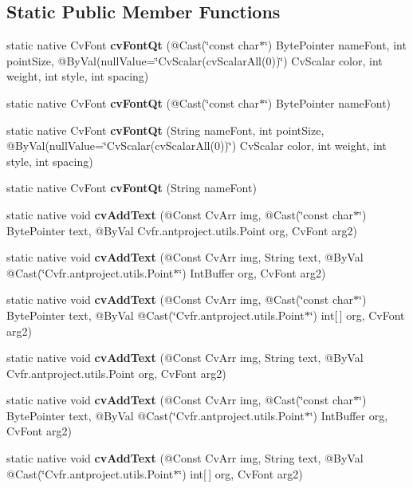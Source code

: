 \subsection*{Static Public Member Functions}
\begin{DoxyCompactItemize}
\item 
static native Cv\+Font {\bfseries cv\+Font\+Qt} (@Cast(\char`\"{}const char$\ast$\char`\"{}) Byte\+Pointer name\+Font, int point\+Size, @By\+Val(null\+Value=\char`\"{}Cv\+Scalar(cv\+Scalar\+All(0))\char`\"{}) Cv\+Scalar color, int weight, int style, int spacing)
\item 
static native Cv\+Font {\bfseries cv\+Font\+Qt} (@Cast(\char`\"{}const char$\ast$\char`\"{}) Byte\+Pointer name\+Font)
\item 
static native Cv\+Font {\bfseries cv\+Font\+Qt} (String name\+Font, int point\+Size, @By\+Val(null\+Value=\char`\"{}Cv\+Scalar(cv\+Scalar\+All(0))\char`\"{}) Cv\+Scalar color, int weight, int style, int spacing)
\item 
static native Cv\+Font {\bfseries cv\+Font\+Qt} (String name\+Font)
\item 
static native void {\bfseries cv\+Add\+Text} (@Const Cv\+Arr img, @Cast(\char`\"{}const char$\ast$\char`\"{}) Byte\+Pointer text, @By\+Val Cv\+fr.antproject.utils.Point org, Cv\+Font arg2)
\item 
static native void {\bfseries cv\+Add\+Text} (@Const Cv\+Arr img, String text, @By\+Val @Cast(\char`\"{}Cv\+fr.antproject.utils.Point$\ast$\char`\"{}) Int\+Buffer org, Cv\+Font arg2)
\item 
static native void {\bfseries cv\+Add\+Text} (@Const Cv\+Arr img, @Cast(\char`\"{}const char$\ast$\char`\"{}) Byte\+Pointer text, @By\+Val @Cast(\char`\"{}Cv\+fr.antproject.utils.Point$\ast$\char`\"{}) int\mbox{[}$\,$\mbox{]} org, Cv\+Font arg2)
\item 
static native void {\bfseries cv\+Add\+Text} (@Const Cv\+Arr img, String text, @By\+Val Cv\+fr.antproject.utils.Point org, Cv\+Font arg2)
\item 
static native void {\bfseries cv\+Add\+Text} (@Const Cv\+Arr img, @Cast(\char`\"{}const char$\ast$\char`\"{}) Byte\+Pointer text, @By\+Val @Cast(\char`\"{}Cv\+fr.antproject.utils.Point$\ast$\char`\"{}) Int\+Buffer org, Cv\+Font arg2)
\item 
static native void {\bfseries cv\+Add\+Text} (@Const Cv\+Arr img, String text, @By\+Val @Cast(\char`\"{}Cv\+fr.antproject.utils.Point$\ast$\char`\"{}) int\mbox{[}$\,$\mbox{]} org, Cv\+Font arg2)
\item 

\end{DoxyCompactItemize}
